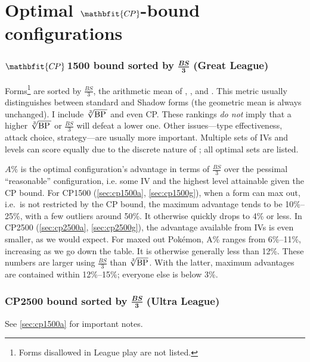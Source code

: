 \chapter{Optimal $\mathbfit{C\kern -1pt P}$-bound configurations\label{chap:optimal}}
\subsection[\CP1500 bound sorted by $\frac{\mathit{BS}}{3}$ (Great League)]%
{$\mathbfit{C\kern -1ptP}$\,1500 bound sorted by $\frac{\mathbfit{BS}}{\mathbf3}$ (Great League)\label{sec:cp1500a}}

Forms\footnote{Forms disallowed in League play are not listed.} are sorted by $\frac{\mathit{BS}}{3}$,
  the arithmetic mean of , , and \MHP\@.
This metric usually distinguishes between standard and Shadow forms (the geometric mean is always unchanged).
I include $\sqrt[3]{\mbox{BP}\,}$ and even CP\@.
These rankings \textit{do not} imply that a higher $\sqrt[3]{\mbox{BP}\,}$ or $\frac{\mathit{BS}}{3}$
  will defeat a lower one.
Other issues---type effectiveness, attack choice, strategy---are usually more important.
Multiple sets of IVs and levels can score equally due to the discrete nature of \MHP\@; all optimal sets are listed.

$A\%$ is the optimal configuration's advantage in terms of $\frac{BS}{3}$
  over the pessimal ``reasonable'' configuration, i.e. some IV
  and the highest level attainable given the CP bound.
For CP1500 (\autoref{sec:cp1500a}, \autoref{sec:cp1500g}), when a form can max out, i.e.\ is not restricted by the CP bound,
  the maximum advantage tends to be 10\%--25\%, with a few outliers around 50\%.
It otherwise quickly drops to 4\% or less.
In CP2500 (\autoref{sec:cp2500a}, \autoref{sec:cp2500g}), the advantage available from IVs is even smaller, as we would expect.
For maxed out Pokémon, A\% ranges from 6\%--11\%, increasing as we go down the table.
It is otherwise generally less than 12\%.
These numbers are larger using $\frac{\mathit{BS}}{3}$ than $\sqrt[3]{\mbox{BP}}$.
With the latter, maximum advantages are contained within 12\%--15\%; everyone else is below 3\%.

\subsection[CP2500 bound sorted by $\frac{\mathit{BS}}{3}$ (Ultra League)]%
{CP2500 bound sorted by $\frac{\mathbfit{BS}}{\mathbf3}$ (Ultra League)\label{sec:cp2500a}}
See \autoref{sec:cp1500a} for important notes.

